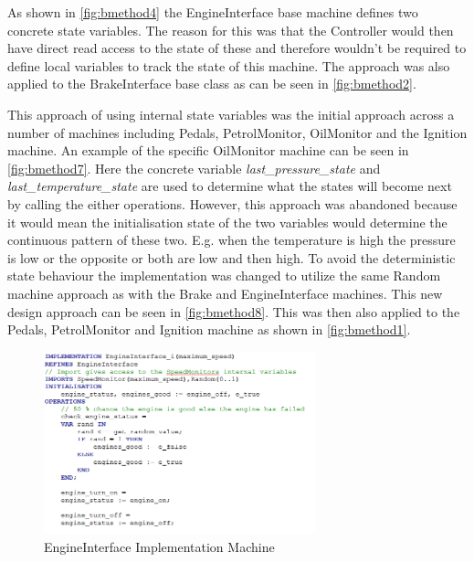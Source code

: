 \documentclass[12pt]{article}
\begin{document}
As shown in \ref{fig:bmethod4} the EngineInterface base machine defines two concrete state variables. The reason for this was that the Controller would then have direct read access to the state of these and therefore wouldn’t be required to define local variables to track the state of this machine. The approach was also applied to the BrakeInterface base class as can be seen in \ref{fig:bmethod2}.

This approach of using internal state variables was the initial approach across a number of machines including Pedals, PetrolMonitor, OilMonitor and the Ignition machine. An example of the specific OilMonitor machine can be seen in \ref{fig:bmethod7}. Here the concrete variable \textit{last\_pressure\_state} and \textit{last\_temperature\_state} are used to determine what the states will become next by calling the either operations. However, this approach was abandoned because it would mean the initialisation state of the two variables would determine the continuous pattern of these two. E.g. when the temperature is high the pressure is low or the opposite or both are low and then high. To avoid the deterministic state behaviour the implementation was changed to utilize the same Random machine approach as with the Brake and EngineInterface machines. This new design approach can be seen in \ref{fig:bmethod8}. This was then also applied to the Pedals, PetrolMonitor and Ignition machine as shown in \ref{fig:bmethod1}.

\begin{figure}
	\centering
	\includegraphics[width=0.7\textwidth]{engine_interface_implementation_v2_1}
	\caption{EngineInterface Implementation Machine }
	\label{fig:bmethod5}
\end{figure}
\end{document}
